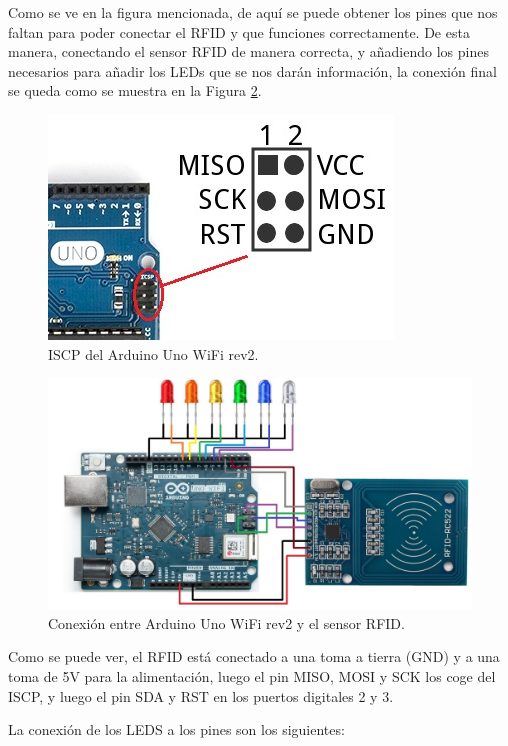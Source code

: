 Como se ve en la figura mencionada, de aquí se puede obtener los pines que nos faltan para poder conectar el RFID y que funciones correctamente. De esta manera, conectando el sensor RFID de manera correcta, y añadiendo los pines necesarios para añadir los LEDs que se nos darán información, la conexión final se queda como se muestra en la Figura \ref{fig:ard1}.

\begin{figure}[h] 
    \centering
    \includegraphics[width=.40\textwidth]{capitulos/capitulo6/iscp.png}
    \caption{ISCP del Arduino Uno WiFi rev2.}
    \label{fig:iscp}
\end{figure}

\begin{figure}[h] 
    \centering
    \includegraphics[width=.75\textwidth]{capitulos/capitulo6/ardunowifirfid.jpg}
    \caption{Conexión entre Arduino Uno WiFi rev2 y el sensor RFID.}
    \label{fig:ard1}
\end{figure}

\newpage
Como se puede ver, el RFID está conectado a una toma a tierra (GND) y a una toma de 5V para la alimentación, luego el pin MISO, MOSI y SCK los coge del ISCP, y luego el pin SDA y RST en los puertos digitales 2 y 3.

La conexión de los LEDS a los pines son los siguientes:

